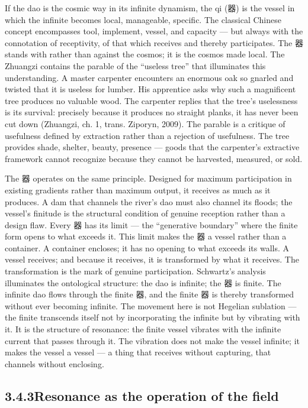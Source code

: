 If the dao is the cosmic way in its infinite dynamism, the qi (器) is the vessel in which the infinite becomes local, manageable, specific. The classical Chinese concept encompasses tool, implement, vessel, and capacity — but always with the connotation of receptivity, of that which receives and thereby participates. The 器 stands with rather than against the cosmos; it is the cosmos made local. The Zhuangzi contains the parable of the “useless tree” that illuminates this understanding. A master carpenter encounters an enormous oak so gnarled and twisted that it is useless for lumber. His apprentice asks why such a magnificent tree produces no valuable wood. The carpenter replies that the tree’s uselessness is its survival: precisely because it produces no straight planks, it has never been cut down (Zhuangzi, ch. 1, trans. Ziporyn, 2009). The parable is a critique of usefulness defined by extraction rather than a rejection of usefulness. The tree provides shade, shelter, beauty, presence — goods that the carpenter’s extractive framework cannot recognize because they cannot be harvested, measured, or sold.

The 器 operates on the same principle. Designed for maximum participation in existing gradients rather than maximum output, it receives as much as it produces. A dam that channels the river’s dao must also channel its floods; the vessel’s finitude is the structural condition of genuine reception rather than a design flaw. Every 器 has its limit — the “generative boundary” where the finite form opens to what exceeds it. This limit makes the 器 a vessel rather than a container. A container encloses; it has no opening to what exceeds its walls. A vessel receives; and because it receives, it is transformed by what it receives. The transformation is the mark of genuine participation. Schwartz’s analysis illuminates the ontological structure: the dao is infinite; the 器 is finite. The infinite dao flows through the finite 器, and the finite 器 is thereby transformed without ever becoming infinite. The movement here is not Hegelian sublation — the finite transcends itself not by incorporating the infinite but by vibrating with it. It is the structure of resonance: the finite vessel vibrates with the infinite current that passes through it. The vibration does not make the vessel infinite; it makes the vessel a vessel — a thing that receives without capturing, that channels without enclosing.

\subsection{3.4.3\quad Resonance as the operation of the field}

